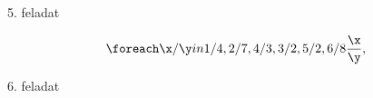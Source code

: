 \documentclass{article}
\begin{document}
\clearpage

\begin{huge}
5. feladat
\end{huge}


\begin{equation}
\foreach \x/\y in {1/4, 2/7, 4/3, 3/2, 5/2, 6/8} %
{ \frac{\x}{\y}, }
\end{equation}

\clearpage

\begin{huge}
6. feladat
\end{huge}


\begin{multicols}{4}
\end{multicols}
\end{document}
